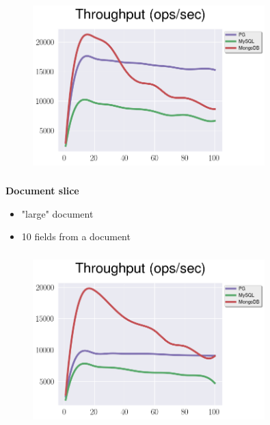 \documentclass[usenames,dvipsnames, 18pt, compress, aspectratio=169]{beamer}
\begin{document}
\begin{frame}
    \frametitle{}
    \begin{center}
    \vspace{10pt}
    \begin{figure}
        \includegraphics[width=0.8\textwidth,center]{benchmarks/select_slice_1_btree_throughput.png}
    \end{figure}
    \end{center}
\end{frame}

\begin{frame}
    \frametitle{}
    \begin{center}
        \textbf{Document slice}
        \begin{itemize}[label={}]
            \item "large" document
            \item 10 fields from a document
        \end{itemize}
    \end{center}
\end{frame}

\begin{frame}
    \frametitle{}
    \begin{center}
    \vspace{10pt}
    \begin{figure}
        \includegraphics[width=0.8\textwidth,center]{benchmarks/select_slice_10_btree_throughput.png}
    \end{figure}
    \end{center}
\end{frame}
\end{document}
